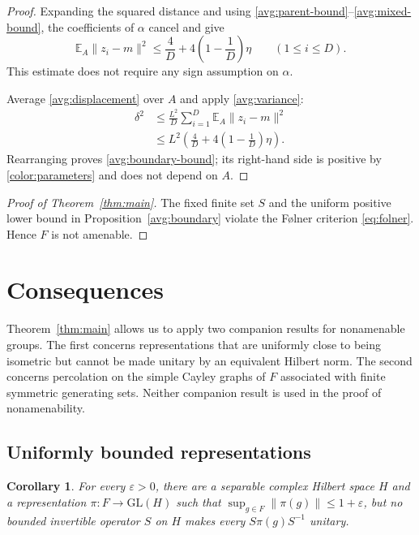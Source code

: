 \documentclass[11pt]{article}
\newcommand{\norm}[1]{\lVert #1\rVert}
\newtheorem{corollary}[theorem]{Corollary}
\theoremstyle{definition}
\numberwithin{equation}{section}
\begin{document}
\begin{proof}
Expanding the squared distance and using
\eqref{avg:parent-bound}--\eqref{avg:mixed-bound}, the coefficients
of $\alpha$ cancel and give
\begin{equation}\label{avg:variance}
  \mathbb E_A\norm{z_i-m}^2
    \leq\frac4D+4\left(1-\frac1D\right)\eta
    \qquad(1\leq i\leq D).
\end{equation}
This estimate does not require any sign assumption on $\alpha$.

Average \eqref{avg:displacement} over $A$ and apply
\eqref{avg:variance}:
\begin{align*}
  \delta^2
  &\leq\frac{L^2}{D}\sum_{i=1}^D
                 \mathbb E_A\norm{z_i-m}^2\\
  &\leq L^2\left(\frac4D+4\left(1-\frac1D\right)\eta\right).
\end{align*}
Rearranging proves \eqref{avg:boundary-bound}; its right-hand side is
positive by \eqref{color:parameters} and does not depend on $A$.
\end{proof}

\begin{proof}[Proof of Theorem~\ref{thm:main}]
The fixed finite set $S$ and the uniform positive lower bound in
Proposition~\ref{avg:boundary} violate the F\o lner criterion
\eqref{eq:folner}.  Hence $F$ is not amenable.
\end{proof}

\section{Consequences}\label{sec:consequences}

Theorem~\ref{thm:main} allows us to apply two companion results for
nonamenable groups. The first concerns representations that are uniformly
close to being isometric but cannot be made unitary by an equivalent
Hilbert norm. The second concerns percolation on the simple Cayley graphs of \(F\)
associated with finite symmetric generating sets.
Neither companion result is used in the proof of nonamenability.

\subsection{Uniformly bounded representations}

\begin{corollary}\label{cor:nonunitarizable}
For every \(\varepsilon>0\), there are a separable complex Hilbert space
\(H\) and a representation \(\pi:F\to\mathrm{GL}(H)\) such that
\(\sup_{g\in F}\norm{\pi(g)}\le1+\varepsilon\), but no bounded invertible
operator \(S\) on \(H\) makes every \(S\pi(g)S^{-1}\) unitary.
\end{corollary}
\end{document}
